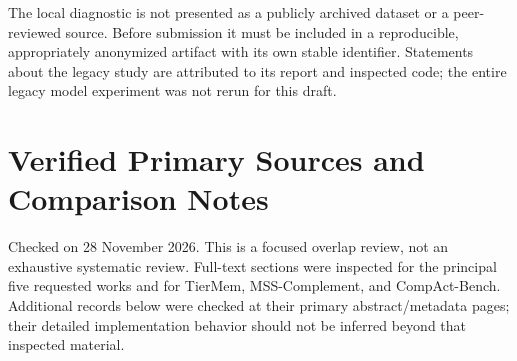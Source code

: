 The local diagnostic is not presented as a publicly archived dataset or
a peer-reviewed source. Before submission it must be included in a
reproducible, appropriately anonymized artifact with its own stable
identifier. Statements about the legacy study are attributed to its
report and inspected code; the entire legacy model experiment was not
rerun for this draft.

\section{Verified Primary Sources and Comparison
Notes}\label{verified-primary-sources-and-comparison-notes}

Checked on 28 November 2026. This is a focused overlap review, not an
exhaustive systematic review. Full-text sections were inspected for the
principal five requested works and for TierMem, MSS-Complement, and
CompAct-Bench. Additional records below were checked at their primary
abstract/metadata pages; their detailed implementation behavior should
not be inferred beyond that inspected material.

